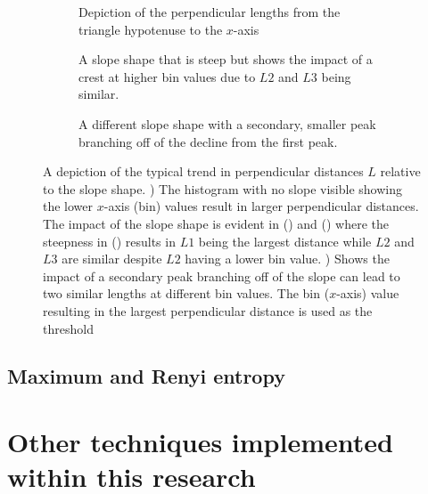 \begin{figure}
\centering
\begin{subfigure}[t]{0.3\textwidth}
    \centering
    \resizebox{!}{4.4cm}{
    
    }
    \caption{Depiction of the perpendicular lengths from the triangle hypotenuse to the $x$-axis}
    \label{subfig:triangleA}
\end{subfigure}
\hfill
\begin{subfigure}[t]{0.3\textwidth}
    \centering
    \resizebox{!}{4.4cm}{
    
    }
    \caption{A slope shape that is steep but shows the impact of a crest at higher bin values due to $L2$ and $L3$ being similar.}
    \label{subfig:triangleB}
\end{subfigure}
\hfill
\begin{subfigure}[t]{0.3\textwidth}
    \centering
    \resizebox{!}{4.4cm}{
    
    }
    \caption{A different slope shape with a secondary, smaller peak branching off of the decline from the first peak.}
    \label{subfig:triangleC}
\end{subfigure}
\caption[A depiction of the typical trend in perpendicular distances $L$ relative to the slope shape]{A depiction of the typical trend in perpendicular distances $L$ relative to the slope shape. ) The histogram with no slope visible showing the lower $x$-axis (bin) values result in larger perpendicular distances. The impact of the slope shape is evident in () and () where the steepness in () results in $L1$ being the largest distance while $L2$ and $L3$ are similar despite $L2$ having a lower bin value. ) Shows the impact of a secondary peak branching off of the slope can lead to two similar lengths at different bin values. The bin ($x$-axis) value resulting in the largest perpendicular distance is used as the threshold}
\label{fig:triangles}
\end{figure}

\subsection{Maximum and Renyi entropy}\label{sec:max_renyi_entr}

\section{Other techniques implemented within this research}

